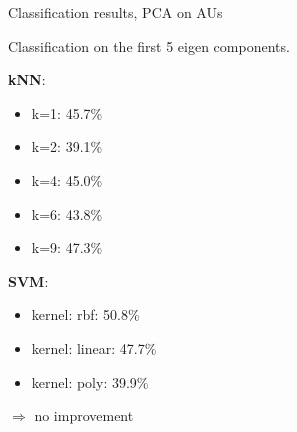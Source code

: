 \documentclass[compress]{beamer}
\begin{document}
\begin{frame}{Classification results, PCA  on AUs}

    Classification on the first 5 eigen components.

    {\bf kNN}:
    \begin{itemize}
        \item k=1: 45.7\%
        \item k=2: 39.1\%
        \item k=4: 45.0\%
        \item k=6: 43.8\%
        \item k=9: 47.3\%
    \end{itemize}

    {\bf SVM}:

    \begin{itemize}
        \item kernel: rbf: 50.8\%
        \item kernel: linear: 47.7\%
        \item kernel: poly: 39.9\%
    \end{itemize}

    $\Rightarrow$ no improvement
\end{frame}
\end{document}

